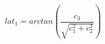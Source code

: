 \begin{equation*}
lat_{1} = arctan \left( \frac{c_{3}}{\sqrt{c_{1}^{2} + c_{2}^{2}}} \right) \tag{4.76}
\end{equation*}
